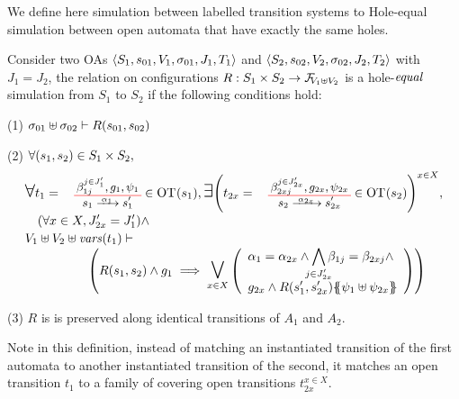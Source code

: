 \documentclass[runningheads]{llncs}
\newcommand{\symb}[1]{\makebox{\it #1}}
\begin{document}
We define here simulation between labelled transition systems to Hole-equal simulation  between  open automata that have exactly the same holes.
\begin{definition}
Consider two OAs \(\OAg[1]\) and \(\OAg[2]\) with  \(J_1 = J_2\), the relation on configurations \(R: S_1 \times S_2 \to \rformulas[V_1 \uplus V_2]\) is a hole-\(\symb{equal}\) simulation from $S_1$ to $S_2$ if the following conditions hold: 
\item[(1)] \(\sigma_{01} \uplus \sigma_{02} \vdash R\mpar{s_{01}, s_{02}}\)
\item[(2)] \(\forall \mpar{s_1, s_2} \in S_1 \times S_2,\)\vspace{-8pt}
\noindent\begin{multline*}
\everymath{\displaystyle}\begin{array}{l}
		\bigsymb{\forall} t_1 = \OTx{1}{}{1}{1} \in \fOT{s_1}, \bigsymb{\exists} \mpar{t_{2x} = \OTx{2}{x}{2x}{2x} \in \fOT{s_2}}^{x \in X}, \\[10pt]
		\quad \mpar{\forall x \in X, J'_{2x}= J'_1} \nwedge\\[2pt]
		 V_1 \uplus V_2 \uplus \fvars{t_1} \vdash\\
\hspace{5em} \left( R\mpar{s_1, s_2} \wedge g_1 \implies \operatorname*{\bigsymb{\bigvee}}_{x \in X} \mpar{\begin{array}{l}
			\alpha_1 = \alpha_{2x} \wedge \bigwedge_\subbox{j \in J'_{2x}} \beta_{1j} = \beta_{2xj} \nwedge\\[12pt]
			 g_{2x} \wedge R\mpar{s'_1, s'_{2x}}\psubst{\psi_1 \uplus \psi_{2x}}
		\end{array}}\right)
	\end{array} 
\end{multline*}
\item[(3)] $R$ is  is preserved along identical transitions of \(A_1\) and \(A_2\).
\end{definition}


Note in this definition, instead of matching an instantiated transition of the first automata to another instantiated transition of the second, it matches an open transition $t_1$ to a family of covering open transitions $t_{2x}^{x\in X}$. %
\end{document}
